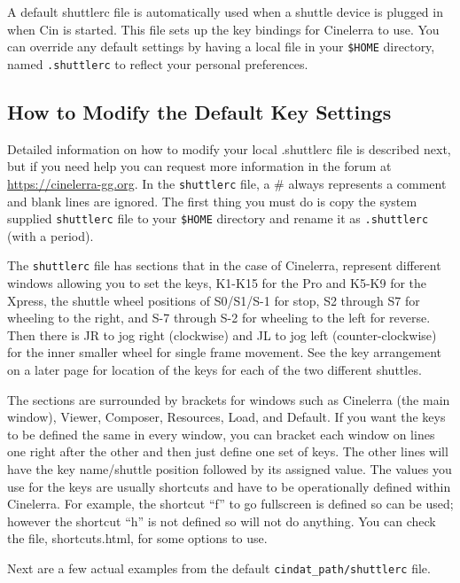 A default shuttlerc file is automatically used when a shuttle device is plugged in when Cin is started. This file sets up the key bindings for Cinelerra to use. You can override any default settings by having a local file in your \texttt{\$HOME} directory, named \texttt{.shuttlerc} to reflect your personal preferences.

\subsection{How to Modify the Default Key Settings}%
\label{sub:modify_default_key_settings}

Detailed information on how to modify your local .shuttlerc file is described next, but if you need help you can request more information in the forum at {\small \url{https://cinelerra-gg.org}}. In the \texttt{shuttlerc} file, a \# always represents a comment and blank lines are ignored.  The first thing you must do is copy the system supplied \texttt{shuttlerc} file to your \texttt{\$HOME} directory and rename it as \texttt{.shuttlerc} (with a period). 

The \texttt{shuttlerc} file has sections that in the case of Cinelerra, represent different windows allowing you to set the keys, K1-K15 for the Pro and K5-K9 for the Xpress, the shuttle wheel positions of S0/S1/S-1 for stop, S2 through S7 for wheeling to the right, and S-7 through S-2 for wheeling to the left for reverse.  Then there is JR to jog right (clockwise) and JL to jog left (counter-clockwise) for the inner smaller wheel for single frame movement.  See the key arrangement on a later page for location of the keys for each of the two different shuttles.

The sections are surrounded by brackets for windows such as Cinelerra (the main window), Viewer, Composer, Resources, Load, and Default.  If you want the keys to be defined the same in every window, you can bracket each window on lines one right after the other and then just define one set of keys.  The other lines will have the key name/shuttle position followed by its assigned value.  The values you use for the keys are usually shortcuts and have to be operationally defined within Cinelerra. For example, the shortcut “f” to go fullscreen is defined so can be used; however the shortcut “h” is not defined so will not do anything.  You can check the file, shortcuts.html, for some options to use.

Next are a few actual examples from the default \texttt{{cindat\_path}/shuttlerc} file.

